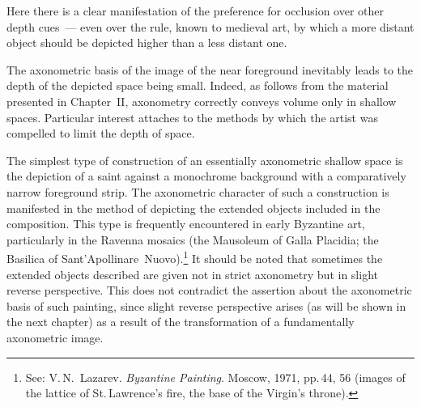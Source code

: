 
Here there is a clear manifestation of the preference for occlusion over other depth
cues~--- even over the rule, known to medieval art, by which a more distant object should
be depicted higher than a less distant one.


The axonometric basis of the image of the near foreground inevitably leads to the depth
of the depicted space being small.  Indeed, as follows from the material presented in
Chapter~II, axonometry correctly conveys volume only in shallow spaces.  Particular
interest attaches to the methods by which the artist was compelled to limit the depth of
space.

The simplest type of construction of an essentially axonometric shallow space is the
depiction of a saint against a monochrome background with a comparatively narrow
foreground strip.  The axonometric character of such a construction is manifested in the
method of depicting the extended objects included in the composition.  This type is
frequently encountered in early Byzantine art, particularly in the Ravenna mosaics (the
Mausoleum of Galla Placidia; the Basilica of Sant'Apollinare~Nuovo).\footnote{%
  See: V.\,N.~Lazarev. \emph{Byzantine Painting}. Moscow, 1971, pp.\,44, 56 (images
  of the lattice of St.\,Lawrence's fire, the base of the Virgin's throne).}
  It should be noted that sometimes the extended objects described are given not in
strict axonometry but in slight reverse perspective.  This does not contradict the
assertion about the axonometric basis of such painting, since slight reverse perspective
arises (as will be shown in the next chapter) as a result of the transformation of a
fundamentally axonometric image.

